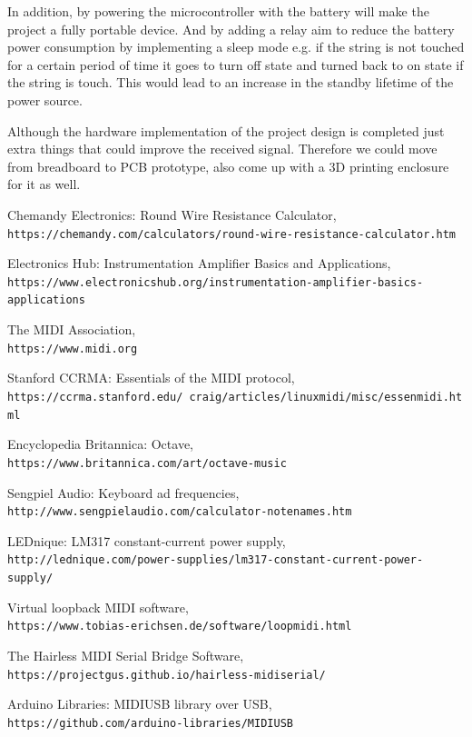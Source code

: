 \documentclass{article}
\begin{document}
In addition, by powering the microcontroller with the battery will make the project a fully portable device. And by adding a relay aim to reduce the battery power consumption by implementing a sleep mode e.g. if the string is not touched for a certain period of time it goes to turn off state and turned back to on state if the string is touch. This would lead to an increase in the standby lifetime of the power source.

Although the hardware implementation of the project design is completed just extra things that could improve the received signal. Therefore we could move from breadboard to PCB prototype, also come up with a 3D printing enclosure for it as well.

\newpage
\begin{thebibliography}{9}

Chemandy Electronics: Round Wire Resistance Calculator,
\\\texttt{https://chemandy.com/calculators/round-wire-resistance-calculator.htm}

Electronics Hub: Instrumentation Amplifier Basics and Applications,
\\\texttt{https://www.electronicshub.org/instrumentation-amplifier-basics-applications}

The MIDI Association,
\\\texttt{https://www.midi.org}

Stanford CCRMA: Essentials of the MIDI protocol,
\\\texttt{https://ccrma.stanford.edu/~craig/articles/linuxmidi/misc/essenmidi.html}

Encyclopedia Britannica: Octave,
\\\texttt{https://www.britannica.com/art/octave-music}

Sengpiel Audio: Keyboard ad frequencies,
\\\texttt{http://www.sengpielaudio.com/calculator-notenames.htm}

LEDnique: LM317 constant-current power supply,
\\\texttt{http://lednique.com/power-supplies/lm317-constant-current-power-supply/}

Virtual loopback MIDI software,
\\\texttt{https://www.tobias-erichsen.de/software/loopmidi.html}

The Hairless MIDI Serial Bridge Software,
\\\texttt{https://projectgus.github.io/hairless-midiserial/}

Arduino Libraries: MIDIUSB library over USB,
\\\texttt{https://github.com/arduino-libraries/MIDIUSB}

\end{thebibliography}
\end{document}
